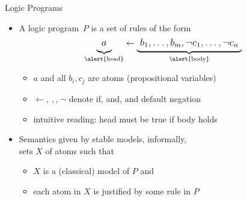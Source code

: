 \begin{frame}{ Logic Programs}
  \begin{itemize}
  \item<2->
    A \alert{logic program}~$P$ is a \alert{set of rules} of the form
    \[\large
    \underbrace{a\raisebox{-4pt}{}}_{\text{\alert{head}}}\leftarrow\underbrace{\raisebox{-4pt}{\ }b_1,\dots,b_m,\neg c_1,\dots,\neg c_n\raisebox{-4pt}{\ }}_{\alert{\text{body}}}
    \]
    \begin{itemize}
    \item $a$ and all $b_i,c_j$ are \alert{atoms} (propositional variables)
    \item \alert{$\leftarrow$}, \alert{$,$}, \alert{$\neg$} denote \alert{if}, \alert{and}, and \alert{default negation}
    \item intuitive reading: \alert{head} must be true \alert{if body} holds
    \end{itemize}
    \medskip
  \item<3->
    Semantics given by \alert{stable models}, informally,\\
    sets $X$ of atoms such that %
    \begin{itemize}
    \item $X$ is a (classical) model of $P$ and
    \item each atom in $X$ is justified by some rule in $P$
    \end{itemize}
  \end{itemize}
\end{frame}
